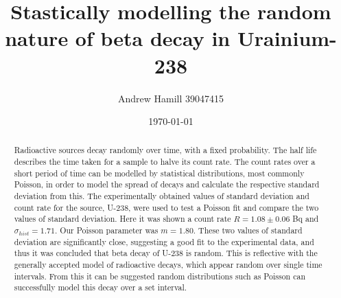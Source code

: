 \documentclass[11pt]{article}
\begin{document}
    \title{Stastically modelling the random nature of beta decay in Urainium-238}
    \author{Andrew Hamill 39047415}
    \date{\today}
    \maketitle

    \begin{abstract}
    \normalsize Radioactive sources decay randomly over time, with a fixed probability. The half life describes the time taken for a sample to halve its count rate. The count rates over a short period of time can be modelled by statistical distributions, most commonly Poisson, in order to model the spread of decays and calculate the respective standard deviation from this. The experimentally obtained values of standard deviation and count rate for the source, U-238, were used to test a Poisson fit and compare the two values of standard deviation. Here it was shown a count rate $ R = 1.08 \pm 0.06$ Bq and $\sigma_{hist} = 1.71$. Our Poisson parameter was $m = 1.80$. These two values of standard deviation are significantly close, suggesting a good fit to the experimental data, and thus it was concluded that beta decay of U-238 is random. This is reflective with the generally accepted model of radioactive decays, which appear random over single time intervals. From this it can be suggested random distributions such as Poisson can successfully model this decay over a set interval. 
    \end{abstract}
\end{document}
